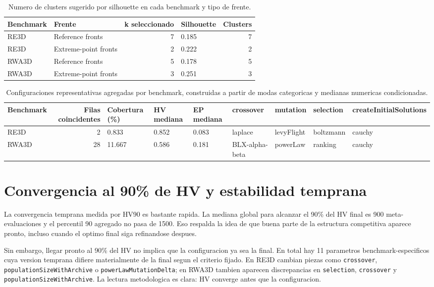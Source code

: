 \documentclass[11pt,a4paper]{article}
\begin{document}
{\scriptsize
\begin{table}[p]
\centering
\caption{Numero de clusters sugerido por silhouette en cada benchmark y tipo de frente.}
\label{tab:configuration_clustering}
\begin{tabular}{llrlr}
\toprule
Benchmark & Frente & k seleccionado & Silhouette & Clusters \\
\midrule
RE3D & Reference fronts & 7 & 0.185 & 7 \\
RE3D & Extreme-point fronts & 2 & 0.222 & 2 \\
RWA3D & Reference fronts & 5 & 0.178 & 5 \\
RWA3D & Extreme-point fronts & 3 & 0.251 & 3 \\
\bottomrule
\end{tabular}
\end{table}

}

{\scriptsize
\begin{table}[p]
\centering
\caption{Configuraciones representativas agregadas por benchmark, construidas a partir de modas categoricas y medianas numericas condicionadas.}
\label{tab:representative_configs}
\begin{tabular}{lrlllllll}
\toprule
Benchmark & Filas coincidentes & Cobertura (\%) & HV mediana & EP mediana & crossover & mutation & selection & createInitialSolutions \\
\midrule
RE3D & 2 & 0.833 & 0.852 & 0.083 & laplace & levyFlight & boltzmann & cauchy \\
RWA3D & 28 & 11.667 & 0.586 & 0.181 & BLX-alpha-beta & powerLaw & ranking & cauchy \\
\bottomrule
\end{tabular}
\end{table}

}

\section{Convergencia al 90\% de HV y estabilidad temprana}

La convergencia temprana medida por HV90 es bastante rapida. La mediana global para alcanzar el 90\% del HV final es 900 meta-evaluaciones y el percentil 90 agregado no pasa de 1500. Eso respalda la idea de que buena parte de la estructura competitiva aparece pronto, incluso cuando el optimo final siga refinandose despues.

Sin embargo, llegar pronto al 90\% del HV no implica que la configuracion ya sea la final. En total hay 11 parametros benchmark-especificos cuya version temprana difiere materialmente de la final segun el criterio fijado. En RE3D cambian piezas como \texttt{crossover}, \texttt{populationSizeWithArchive} o \texttt{powerLawMutationDelta}; en RWA3D tambien aparecen discrepancias en \texttt{selection}, \texttt{crossover} y \texttt{populationSizeWithArchive}. La lectura metodologica es clara: HV converge antes que la configuracion.
\end{document}
